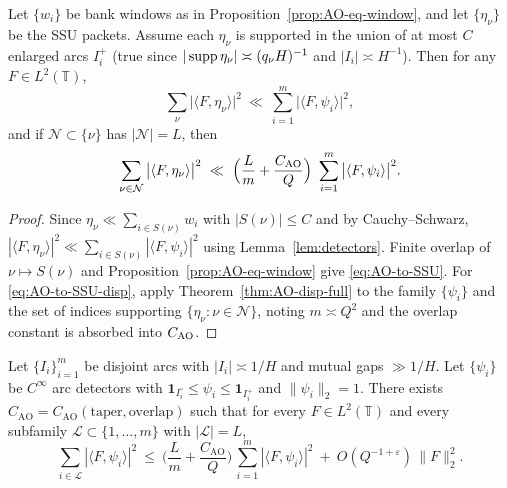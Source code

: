 \begin{corollary}\label{cor:AO-to-SSU}
Let $\{w_i\}$ be bank windows as in Proposition~\ref{prop:AO-eq-window}, and let $\{\eta_\nu\}$ be the SSU packets.
Assume each $\eta_\nu$ is supported in the union of at most $C$ enlarged arcs $I_i^+$ (true since $|\operatorname{supp}\eta_\nu|\asymp (q_\nu H)^{-1}$ and $|I_i|\asymp H^{-1}$).
Then for any $F\in L^2(\mathbb T)$,
\begin{equation}\label{eq:AO-to-SSU}
\sum_{\nu} \big|\langle F,\eta_\nu\rangle\big|^2
\ \ll\ \sum_{i=1}^{m} \big|\langle F,\psi_i\rangle\big|^2,
\end{equation}
and if $\mathcal N\subset\{\nu\}$ has $|\mathcal N|=L$, then
\begin{equation}\label{eq:AO-to-SSU-disp}
\sum_{\nu\in\mathcal N} \big|\langle F,\eta_\nu\rangle\big|^2
\ \ll\ \Big(\frac{L}{m}+\frac{C_{\rm AO}}{Q}\Big)\ \sum_{i=1}^{m} \big|\langle F,\psi_i\rangle\big|^2.
\end{equation}
\end{corollary}

\begin{proof}
Since $\eta_\nu\ll \sum_{i\in S(\nu)} w_i$ with $|S(\nu)|\le C$ and by Cauchy–Schwarz, 
$|\langle F,\eta_\nu\rangle|^2 \ll \sum_{i\in S(\nu)} |\langle F,\psi_i\rangle|^2$ using Lemma~\ref{lem:detectors}.
Finite overlap of $\nu\mapsto S(\nu)$ and Proposition~\ref{prop:AO-eq-window} give \eqref{eq:AO-to-SSU}.
For \eqref{eq:AO-to-SSU-disp}, apply Theorem~\ref{thm:AO-disp-full} to the family $\{\psi_i\}$ and the set of indices supporting $\{\eta_\nu:\nu\in\mathcal N\}$, noting $m\asymp Q^2$ and the overlap constant is absorbed into $C_{\rm AO}$.
\end{proof}

\begin{theorem}\label{thm:AO-explicit}
Let $\{I_i\}_{i=1}^m$ be disjoint arcs with $|I_i|\asymp 1/H$ and mutual gaps $\gg 1/H$.
Let $\{\psi_i\}$ be $C^\infty$ arc detectors with $\mathbf{1}_{I_i^\circ}\le \psi_i\le \mathbf{1}_{I_i^+}$ and $\| \psi_i\|_2=1$.
There exists $C_{\mathrm{AO}}=C_{\mathrm{AO}}(\text{taper},\text{overlap})$ such that for every $F\in L^2(\mathbb T)$ and every subfamily $\mathcal L\subset\{1,\dots,m\}$ with $|\mathcal L|=L$,
\[
\sum_{i\in\mathcal L} |\langle F,\psi_i\rangle|^2
\ \le\ \Big(\frac{L}{m} + \frac{C_{\mathrm{AO}}}{Q}\Big)\,\sum_{i=1}^m |\langle F,\psi_i\rangle|^2
\ +\ O(Q^{-1+\varepsilon})\,\|F\|_2^2.
\]
\end{theorem}

